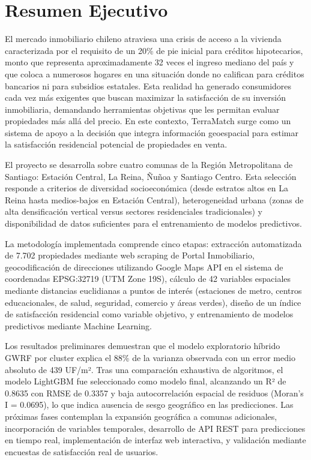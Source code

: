 
\newpage
\section*{Resumen Ejecutivo}


El mercado inmobiliario chileno atraviesa una crisis de acceso a la vivienda caracterizada por el requisito de un 20\% de pie inicial para créditos hipotecarios, monto que representa aproximadamente 32 veces el ingreso mediano del país y que coloca a numerosos hogares en una situación donde no califican para créditos bancarios ni para subsidios estatales. Esta realidad ha generado consumidores cada vez más exigentes que buscan maximizar la satisfacción de su inversión inmobiliaria, demandando herramientas objetivas que les permitan evaluar propiedades más allá del precio. En este contexto, TerraMatch surge como un sistema de apoyo a la decisión que integra información geoespacial para estimar la satisfacción residencial potencial de propiedades en venta.

El proyecto se desarrolla sobre cuatro comunas de la Región Metropolitana de Santiago: Estación Central, La Reina, Ñuñoa y Santiago Centro. Esta selección responde a criterios de diversidad socioeconómica (desde estratos altos en La Reina hasta medios-bajos en Estación Central), heterogeneidad urbana (zonas de alta densificación vertical versus sectores residenciales tradicionales) y disponibilidad de datos suficientes para el entrenamiento de modelos predictivos.

La metodología implementada comprende cinco etapas: extracción automatizada de 7.702 propiedades mediante web scraping de Portal Inmobiliario, geocodificación de direcciones utilizando Google Maps API en el sistema de coordenadas EPSG:32719 (UTM Zone 19S), cálculo de 42 variables espaciales mediante distancias euclidianas a puntos de interés (estaciones de metro, centros educacionales, de salud, seguridad, comercio y áreas verdes), diseño de un índice de satisfacción residencial como variable objetivo, y entrenamiento de modelos predictivos mediante Machine Learning.

Los resultados preliminares demuestran que el modelo exploratorio híbrido GWRF por cluster explica el 88\% de la varianza observada con un error medio absoluto de 439 UF/m². Tras una comparación exhaustiva de algoritmos, el modelo LightGBM fue seleccionado como modelo final, alcanzando un R² de 0.8635 con RMSE de 0.3357 y baja autocorrelación espacial de residuos (Moran's I = 0.0695), lo que indica ausencia de sesgo geográfico en las predicciones. Las próximas fases contemplan la expansión geográfica a comunas adicionales, incorporación de variables temporales, desarrollo de API REST para predicciones en tiempo real, implementación de interfaz web interactiva, y validación mediante encuestas de satisfacción real de usuarios.
